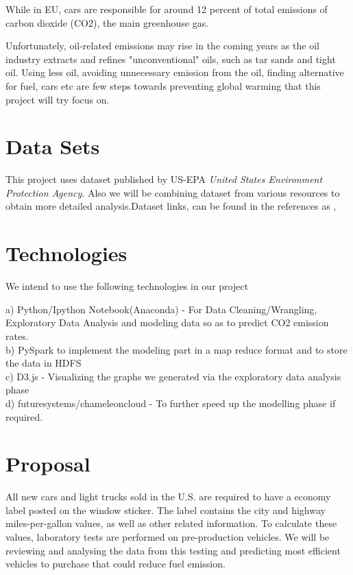 \documentclass{acm_proc_article-sp}
\begin{document}
While in EU, cars are responsible for around 12 percent of total emissions of carbon dioxide (CO2), the main greenhouse gas.

Unfortunately, oil-related emissions may rise in the coming years as the oil industry extracts and refines "unconventional" oils, such as tar sands and tight oil. Using less oil, avoiding unnecessary emission from the oil, finding alternative for fuel, cars etc are few steps towards preventing global warming that this project will try focus on. \cite{ConcernedScientists2014}

\section{Data Sets}
This project uses dataset published by US-EPA \textit{United States Environment Protection Agency}. Also we will be combining dataset from various resources to obtain more detailed analysis.Dataset links, can be found in the references as
\cite{2014}, \cite{2015}


\section{Technologies}
We intend to use the following technologies in our project

a) Python/Ipython Notebook(Anaconda) - For Data Cleaning/Wrangling, Exploratory Data Analysis and modeling data so as to predict CO2 emission rates. \\
b) PySpark to implement the modeling part in a map reduce format and to store the data in HDFS\\
c) D3.js - Visualizing the graphs we generated via the exploratory data analysis phase\\
d) futuresystems/chameleoncloud - To further speed up the modelling phase if required.

\section{Proposal}
All new cars and light trucks sold in the U.S. are required to have a economy label posted on the window sticker. The label contains the city and highway miles-per-gallon values, as well as other related information. To calculate these values, laboratory tests are performed on pre-production vehicles.
We will be reviewing and analysing the data from this testing and predicting most efficient vehicles to purchase that could reduce fuel emission.
\end{document}
